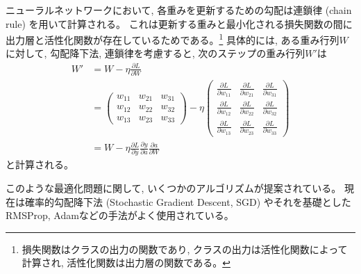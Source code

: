 ニューラルネットワークにおいて, 各重みを更新するための勾配は連鎖律 (chain rule) を用いて計算される。
これは更新する重みと最小化される損失関数の間に出力層と活性化関数が存在しているためである。\footnote{損失関数はクラスの出力の関数であり, クラスの出力は活性化関数によって計算され, 活性化関数は出力層の関数である。}
具体的には, ある重み行列$W$に対して, 勾配降下法, 連鎖律を考慮すると, 次のステップの重み行列$W'$は
\begin{equation}
 \begin{split}
  W' &= W - \eta \frac{\partial L}{\partial W}\\
    &=
  \left(
    \begin{array}{ccc}
      w_{11} & w_{21} & w_{31} \\
      w_{12} & w_{22} & w_{32} \\
      w_{13} & w_{23} & w_{33}
    \end{array}
  \right)
  - \eta
  \left(
    \begin{array}{ccc}
      \frac{\partial L}{\partial w_{11}} & \frac{\partial L}{\partial w_{21}} & \frac{\partial L}{\partial w_{31}} \\
      \frac{\partial L}{\partial w_{12}} & \frac{\partial L}{\partial w_{22}} & \frac{\partial L}{\partial w_{32}} \\
      \frac{\partial L}{\partial w_{13}} & \frac{\partial L}{\partial w_{23}} & \frac{\partial L}{\partial w_{33}}
    \end{array}
  \right)\\
    &= W - \eta \frac{\partial L}{\partial y}\frac{\partial y}{\partial a}\frac{\partial a}{\partial W}
 \end{split}
\end{equation}
と計算される。

このような最適化問題に関して, いくつかのアルゴリズムが提案されている。
現在は確率的勾配降下法 (Stochastic Gradient Descent, SGD\cite{SGD}) やそれを基礎としたRMSProp\cite{RMSProp}, Adam\cite{Adam}などの手法がよく使用されている。

